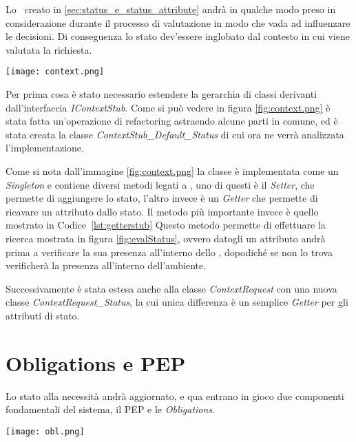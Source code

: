 Lo \status \ creato in \ref{sec:status_e_status_attribute} andrà in qualche modo preso in considerazione durante il processo di valutazione in modo che vada ad influenzare le decisioni.
Di conseguenza lo stato dev'essere inglobato dal contesto in cui viene valutata la richiesta.
\begin{sidewaysfigure}
    \centering
	\texttt{[image: context.png]}
    \caption{Grafico UML del contesto}
    \label{fig:context.png}
\end{sidewaysfigure}

Per prima cosa è stato necessario estendere la gerarchia di classi derivanti dall'interfaccia \textit{IContextStub}. Come si può vedere in figura \ref{fig:context.png} è stata fatta un'operazione di refactoring astraendo alcune parti in comune, ed è stata creata la classe \textit{ContextStub\_Default\_Status} di cui ora ne verrà analizzata l'implementazione.\\ \par
Come si nota dall'immagine \ref{fig:context.png} la classe è implementata come un \textit{Singleton} e contiene diversi metodi legati a \status, uno di questi è il \textit{Setter}, che permette di aggiungere lo stato, l'altro invece è un \textit{Getter} che permette di ricavare un attributo dallo stato.
Il metodo più importante invece è quello mostrato in Codice~\ref{lst:getterstub}
Questo metodo permette di effettuare la ricerca mostrata in figura \ref{fig:evalStatus}, ovvero datogli un attributo andrà prima a verificare la sua presenza all'interno dello \status, dopodiché se non lo trova verificherà la presenza all'interno dell'ambiente.\\ \par
Successivamente è stata estesa anche alla classe \textit{ContextRequest} con una nuova classe \textit{ContextRequest\_Status}, la cui unica differenza è un semplice \textit{Getter} per gli attributi di stato.

\section{Obligations e PEP} %
\label{sec:obligations_e_pep}

Lo stato alla necessità andrà aggiornato, e qua entrano in gioco due componenti fondamentali del sistema, il PEP e le \textit{Obligations}. 

\begin{sidewaysfigure}
    \centering
	\texttt{[image: obl.png]}
    \caption{Relazioni tra Obligation e PEP}
    \label{fig:obl.png}
\end{sidewaysfigure}


